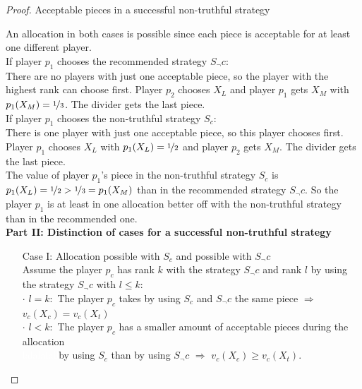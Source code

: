 \begin{proof}
\begin{table}[htb]
\caption{Acceptable pieces in a successful non-truthful strategy}\label{Table11}
\end{table}
An allocation in both cases is possible since each piece is acceptable for at least one different player.\\ \newline If player $p_1$ chooses the recommended strategy $S_\neg c$:\\
There are no players with just one acceptable piece, so the player with the highest rank can choose first.
Player $p_2$ chooses $X_L$ and player $p_1$ gets $X_M$ with $p_1(X_M)= \nicefrac{1}{3}$. The divider gets the last piece.\\
\newline
If player $p_1$ chooses the non-truthful strategy $S_c$:\\
There is one player with just one acceptable piece, so this player chooses first.
Player $p_1$ chooses $X_L$ with $p_1(X_L)= \nicefrac{1}{2}$ and player $p_2$ gets $X_M$. The divider gets the last piece.\\
The value of player $p_1$'s piece in the non-truthful strategy $S_c$ is $p_1(X_L)=\nicefrac{1}{2}>\nicefrac{1}{3}=p_1(X_M)$ than in the recommended strategy $S_\neg c$. So the player $p_1$ is at least in one allocation better off with the non-truthful strategy than in the recommended one.\\
\newline
\textbf{Part II: Distinction of cases for a successful non-truthful strategy} 
\begin{itemize}
\item[Case] I: Allocation possible with $S_c$ and possible with $S_\neg c$\\
Assume the player $p_c$ has rank $k$ with the strategy $S_\neg c$ and rank $l$ by using the strategy $S_\neg c$ with $l \leq k$:\\ 
$\cdot$ $l = k:$ The player $p_c$ takes by using $S_c$ and $S_\neg c$ the same piece $\Rightarrow$ $v_c(X_c)=v_c(X_t)$\\
$\cdot$ $l < k:$ The player $p_c$ has a smaller amount of acceptable pieces during the allocation\\\textcolor{white}{lalalalall}\textcolor{black}{}by using $S_c$ than by using $S_\neg c$ $\Rightarrow$ $v_c(X_c)\geq v_c(X_t)$.


\end{itemize}
\end{proof}
